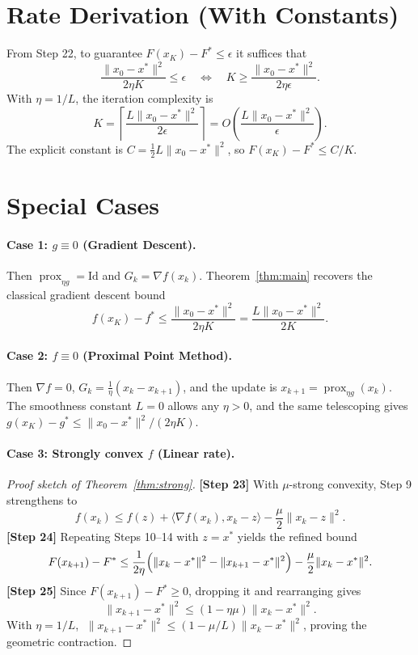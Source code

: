 \documentclass[11pt]{article}
\begin{document}
\section*{Rate Derivation (With Constants)}

From Step 22, to guarantee $F(x_K) - F^\ast \le \epsilon$ it suffices that
\[
\frac{\|x_0-x^\ast\|^2}{2\eta K} \le \epsilon
\quad\Longleftrightarrow\quad
K \ge \frac{\|x_0 - x^\ast\|^2}{2\eta\epsilon}.
\]
With $\eta = 1/L$, the iteration complexity is
\[
K = \left\lceil \frac{L\|x_0 - x^\ast\|^2}{2\epsilon}\right\rceil = O\!\left(\frac{L\|x_0-x^\ast\|^2}{\epsilon}\right).
\]
The explicit constant is $C = \tfrac{1}{2}L\|x_0-x^\ast\|^2$, so $F(x_K)-F^\ast \le C/K$.

\section*{Special Cases}

\paragraph{Case 1: $g\equiv 0$ (Gradient Descent).}
Then $\operatorname{prox}_{\eta g}=\mathrm{Id}$ and $G_k=\nabla f(x_k)$. Theorem~\ref{thm:main} recovers the classical gradient descent bound
\[
f(x_K) - f^\ast \le \frac{\|x_0-x^\ast\|^2}{2\eta K} = \frac{L\|x_0-x^\ast\|^2}{2K}.
\]

\paragraph{Case 2: $f\equiv 0$ (Proximal Point Method).}
Then $\nabla f=0$, $G_k=\tfrac1\eta(x_k-x_{k+1})$, and the update is $x_{k+1}=\operatorname{prox}_{\eta g}(x_k)$. The smoothness constant $L=0$ allows any $\eta>0$, and the same telescoping gives $g(x_K)-g^\ast\le \|x_0-x^\ast\|^2/(2\eta K)$.

\paragraph{Case 3: Strongly convex $f$ (Linear rate).}
\begin{proof}[Proof sketch of Theorem~\ref{thm:strong}]
\textbf{[Step 23]} With $\mu$-strong convexity, Step 9 strengthens to
\[
f(x_k) \le f(z) + \langle\nabla f(x_k), x_k - z\rangle - \frac{\mu}{2}\|x_k - z\|^2.
\]
\textbf{[Step 24]} Repeating Steps 10--14 with $z=x^\ast$ yields the refined bound
\[
F(x_{k+1}) - F^\ast \le \frac{1}{2\eta}\Bigl(\|x_k-x^\ast\|^2 - \|x_{k+1}-x^\ast\|^2\Bigr) - \frac{\mu}{2}\|x_k - x^\ast\|^2.
\]
\textbf{[Step 25]} Since $F(x_{k+1})-F^\ast\ge0$, dropping it and rearranging gives
\[
\|x_{k+1}-x^\ast\|^2 \le (1-\eta\mu)\|x_k-x^\ast\|^2.
\]
With $\eta=1/L$, $\;\|x_{k+1}-x^\ast\|^2 \le (1-\mu/L)\|x_k-x^\ast\|^2$, proving the geometric contraction. \qedhere
\end{proof}
\end{document}
